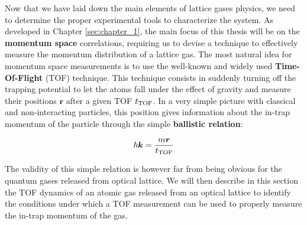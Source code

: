 Now that we have laid down the main elements of lattice gases physics, we need to determine the proper experimental tools to characterize the system. As developed in Chapter \ref{sec:chapter_1}, the main focus of this thesis will be on the \textbf{momentum space} correlations, requiring us to devise a technique to effectively measure the momentum distribution of a lattice gas. The most natural idea for momentum space measurements is to use the well-known and widely used \textbf{Time-Of-Flight} (TOF) technique. This technique consists in suddenly turning off the trapping potential to let the atoms fall under the effect of gravity and measure their positions $\bm{r}$ after a given TOF $t_{\rm{TOF}}$. In a very simple picture with classical and non-interacting particles, this position gives information about the in-trap momentum of the particle through the simple \textbf{ballistic relation}:

\begin{equation}
    \hbar \bm{k} = \frac{m \bm{r}}{t_{\rm{TOF}}}
\end{equation}

The validity of this simple relation is however far from being obvious for the quantum gases released from optical lattice. We will then describe in this section the TOF dynamics of an atomic gas released from an optical lattice to identify the conditions under which a TOF measurement can be used to properly measure the in-trap momentum of the gas.





